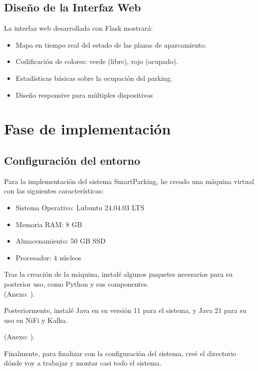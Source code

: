 \documentclass{../../../miPlantilla}
\begin{document}
\subsection{Diseño de la Interfaz Web}
La interfaz web desarrollada con Flask mostrará:
\begin{itemize}
  \item Mapa en tiempo real del estado de las plazas de aparcamiento.
  \item Codificación de colores: verde (libre), rojo (ocupado).
  \item Estadísticas básicas sobre la ocupación del parking.
  \item Diseño responsive para múltiples dispositivos
\end{itemize}

\section{Fase de implementación}

\subsection{Configuración del entorno}
Para la implementación del sistema SmartParking, he creado una máquina virtual con las siguientes características:
\begin{itemize}
  \item Sistema Operativo: Lubuntu 24.04.03 LTS
  \item Memoria RAM: 8 GB
  \item Almacenamiento: 50 GB SSD
  \item Procesador: 4 núcleos
\end{itemize}

Tras la creación de la máquina, instalé algunos paquetes necesarios para su posterior uso, como Python y sus componentes.\\
{\small(Anexo: )}.

Posteriormente, instalé Java en su versión 11 para el sistema, y Java 21 para su uso en NiFi y Kafka.
\begin{center}
  {\small(Anexo: )}.
\end{center}

Finalmente, para finalizar con la configuración del sistema, creé el directorio dónde voy a trabajar y montar casi todo el sistema.
\end{document}
